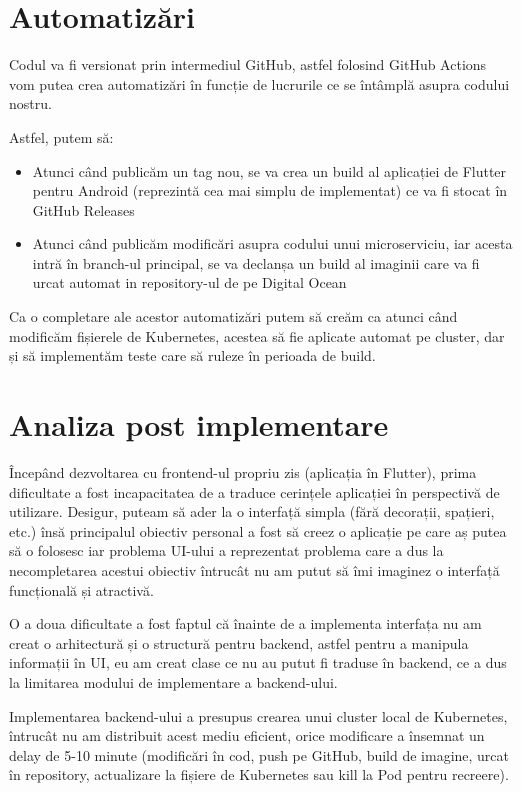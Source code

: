 \section{Automatizări}

Codul va fi versionat prin intermediul GitHub, astfel folosind GitHub Actions vom putea crea
automatizări în funcție de lucrurile ce se întâmplă asupra codului nostru.

Astfel, putem să:

\begin{itemize}
    \item Atunci când publicăm un tag nou, se va crea un build al aplicației de Flutter pentru Android
          (reprezintă cea mai simplu de implementat) ce va fi stocat în GitHub Releases
    \item Atunci când publicăm modificări asupra codului unui microserviciu, iar acesta intră în branch-ul principal,
          se va declanșa un build al imaginii care va fi urcat automat in repository-ul de pe Digital Ocean
\end{itemize}

Ca o completare ale acestor automatizări putem să creăm ca atunci când modificăm
fișierele de Kubernetes, acestea să fie aplicate automat pe cluster, dar și
să implementăm teste care să ruleze în perioada de build.


\section{Analiza post implementare}

Începând dezvoltarea cu frontend-ul propriu zis (aplicația în Flutter), prima dificultate a fost
incapacitatea de a traduce cerințele aplicației în perspectivă de utilizare. Desigur, puteam să
ader la o interfață simpla (fără decorații, spațieri, etc.) însă principalul obiectiv personal
a fost să creez o aplicație pe care aș putea să o folosesc iar problema UI-ului a
reprezentat problema care a dus la necompletarea acestui obiectiv întrucât nu am putut
să îmi imaginez o interfață funcțională și atractivă.

O a doua dificultate a fost faptul că înainte de a implementa interfața nu am creat o arhitectură și
o structură pentru backend, astfel pentru a manipula informații în UI, eu am creat clase
ce nu au putut fi traduse în backend, ce a dus la limitarea modului de implementare a backend-ului.

Implementarea backend-ului a presupus crearea unui cluster local de Kubernetes,
întrucât nu am distribuit acest mediu eficient, orice modificare a însemnat un delay de 5-10 minute
(modificări în cod, push pe GitHub, build de imagine, urcat în repository, actualizare la fișiere
de Kubernetes sau kill la Pod pentru recreere).

